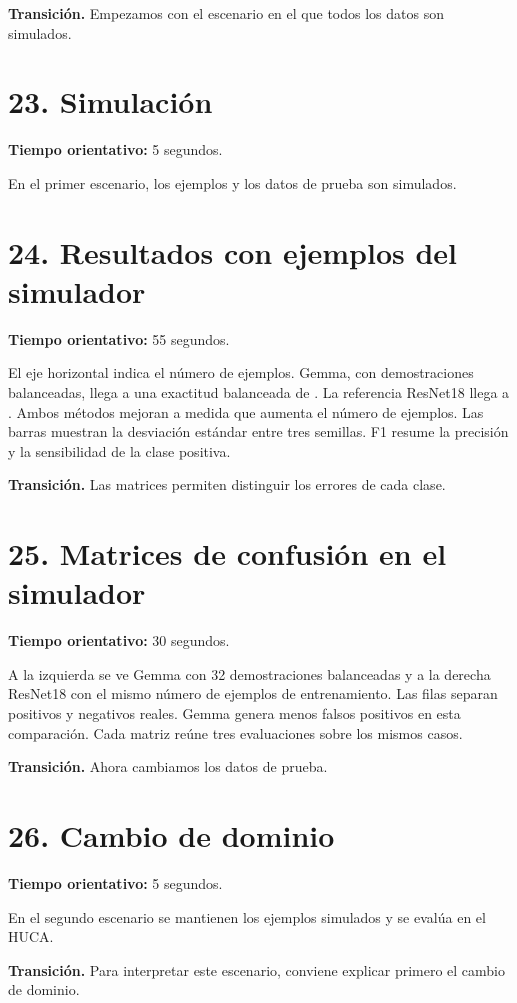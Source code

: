 \documentclass[11pt,a4paper]{article}
\begin{document}
\textbf{Transición.} Empezamos con el escenario en el que todos los datos son simulados.

\section*{23. Simulación}
\textbf{Tiempo orientativo: }5 segundos.

En el primer escenario, los ejemplos y los datos de prueba son simulados.

\section*{24. Resultados con ejemplos del simulador}
\textbf{Tiempo orientativo: }55 segundos.

El eje horizontal indica el número de ejemplos. Gemma, con demostraciones balanceadas, llega a una exactitud balanceada de \SimVlmBA{}. La referencia ResNet18 llega a \SimCnnBA{}. Ambos métodos mejoran a medida que aumenta el número de ejemplos. Las barras muestran la desviación estándar entre tres semillas. F1 resume la precisión y la sensibilidad de la clase positiva.

\textbf{Transición.} Las matrices permiten distinguir los errores de cada clase.

\section*{25. Matrices de confusión en el simulador}
\textbf{Tiempo orientativo: }30 segundos.

A la izquierda se ve Gemma con 32 demostraciones balanceadas y a la derecha ResNet18 con el mismo número de ejemplos de entrenamiento. Las filas separan positivos y negativos reales. Gemma genera menos falsos positivos en esta comparación. Cada matriz reúne tres evaluaciones sobre los mismos casos.

\textbf{Transición.} Ahora cambiamos los datos de prueba.

\section*{26. Cambio de dominio}
\textbf{Tiempo orientativo: }5 segundos.

En el segundo escenario se mantienen los ejemplos simulados y se evalúa en el HUCA.

\textbf{Transición.} Para interpretar este escenario, conviene explicar primero el cambio de dominio.
\end{document}
